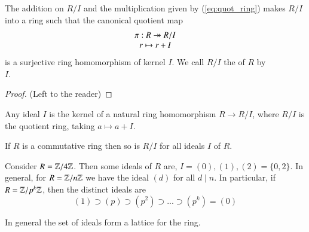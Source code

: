 \begin{theorem}
    The addition on $R/I$ and the multiplication given by (\ref{eq:quot_ring}) makes $R/I$ into a ring such that the canonical quotient map \begin{equation}
        \begin{array}{c} \pi: R \twoheadrightarrow R/I \\ r\mapsto r+I \end{array}
    \end{equation}
    is a surjective ring homomorphism of kernel $I$. We call $R/I$ the  of $R$ by \\$I$.
    \begin{proof}
        (Left to the reader)
    \end{proof}
\end{theorem}

\begin{theorem}
        Any ideal $I$ is the kernel of a natural ring homomorphism $R \rightarrow R/I$, where $R/I$ is the quotient ring, taking $a \mapsto a+I$. 
\end{theorem}

\begin{remark}
    If $R$ is a commutative ring then so is $R/I$ for all ideals $I$ of $R$.
\end{remark}

\begin{example}
        Consider $R = \mathbb Z/4\mathbb Z$. Then some ideals of $R$ are, $I = (0),(1),(2) = \{0,2\}$. In general, for $R = \mathbb Z/n\mathbb Z$ we have the ideal $(d)$ for all $d \;\vert\;n$. In particular, if $R = \mathbb Z/p^k\mathbb Z$, then the distinct ideals are $$(1)\supset(p)\supset(p^2)\supset...\supset(p^k)=(0)$$
\end{example}


\begin{remark}
        In general the set of ideals form a lattice for the ring.
\end{remark}


